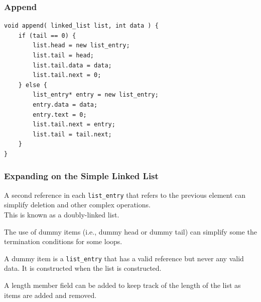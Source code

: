 \begin{frame}[fragile]
\frametitle{Append}

\begin{verbatim}
void append( linked_list list, int data ) {
    if (tail == 0) {
        list.head = new list_entry;
        list.tail = head;
        list.tail.data = data;
        list.tail.next = 0;
    } else { 
        list_entry* entry = new list_entry;
        entry.data = data;
        entry.text = 0;
        list.tail.next = entry;
        list.tail = tail.next;
    }
}
\end{verbatim}

\end{frame}






\begin{frame}
\frametitle{Expanding on the Simple Linked List}

A second reference in each \texttt{list\_entry} that refers to the previous element can simplify deletion and other complex operations.\\
\quad This is known as a doubly-linked list.

The use of dummy items (i.e., dummy head or dummy tail) can simplify some the termination conditions for some loops.

A dummy item is a \texttt{list\_entry} that has a valid reference but never any valid data. It is constructed when the list is constructed.

A length member field can be added to keep track of the length of the list as items are added and removed.

\end{frame}



